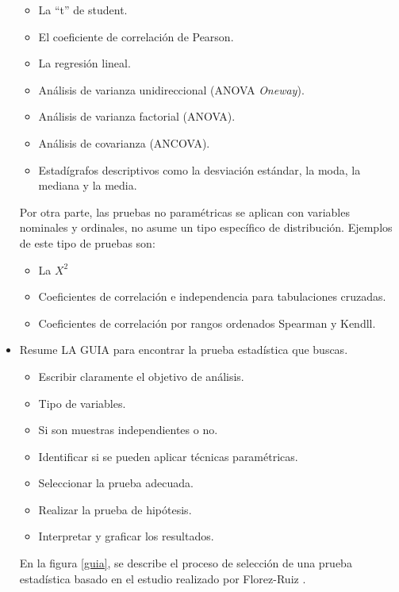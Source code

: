 \documentclass{article}
\begin{document}
\begin{itemize}
    \begin{itemize}
        \item La “t” de student.
        \item El coeficiente de correlación de Pearson.
        \item La regresión lineal.
        \item Análisis de varianza unidireccional (ANOVA \textit{Oneway}).
        \item Análisis de varianza factorial (ANOVA).
        \item Análisis de covarianza (ANCOVA).
        \item Estadígrafos descriptivos como la desviación estándar, la moda, la mediana y la media.
    \end{itemize}
    Por otra parte, las pruebas no paramétricas se aplican con variables nominales y ordinales, no asume un tipo específico de distribución. Ejemplos de este tipo de pruebas son:
    
    \begin{itemize}
        \item La $X^2$
        \item Coeficientes de correlación e independencia para tabulaciones cruzadas.
        \item Coeficientes de correlación por rangos ordenados Spearman y Kendll.
    \end{itemize}
    
    \item Resume LA GUIA para encontrar la prueba estadística que buscas. 
    
    \begin{itemize}
        \item Escribir claramente el objetivo de análisis.
        \item Tipo de variables.
        \item Si son muestras independientes o no.
        \item Identificar si se pueden aplicar técnicas paramétricas.
        \item Seleccionar la prueba adecuada.
        \item Realizar la prueba de hipótesis.
        \item Interpretar y graficar los resultados.
    \end{itemize}
    
    En la figura \ref{guia}, se describe el proceso de selección de una prueba estadística basado en el estudio realizado por Florez-Ruiz \cite{guia}.
    

\end{itemize}
\end{document}
